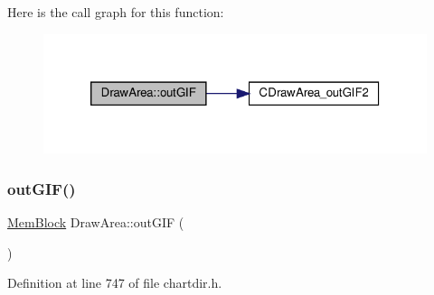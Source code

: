 Here is the call graph for this function\+:
\nopagebreak
\begin{figure}[H]
\begin{center}
\leavevmode
\includegraphics[width=320pt]{class_draw_area_ac6de24287102bd8e83aaf7a8c7e3eb56_cgraph}
\end{center}
\end{figure}
\mbox{\label{class_draw_area_aa3b58d71f07e7e558ad8895b0ea9ba95}} 
\subsubsection{\texorpdfstring{out\+G\+I\+F()}{outGIF()}\hspace{0.1cm}{\footnotesize\ttfamily [3/3]}}
{\footnotesize\ttfamily \hyperlink{class_mem_block}{Mem\+Block} Draw\+Area\+::out\+G\+IF (\begin{DoxyParamCaption}{ }\end{DoxyParamCaption})\hspace{0.3cm}{\ttfamily [inline]}}



Definition at line 747 of file chartdir.\+h.

